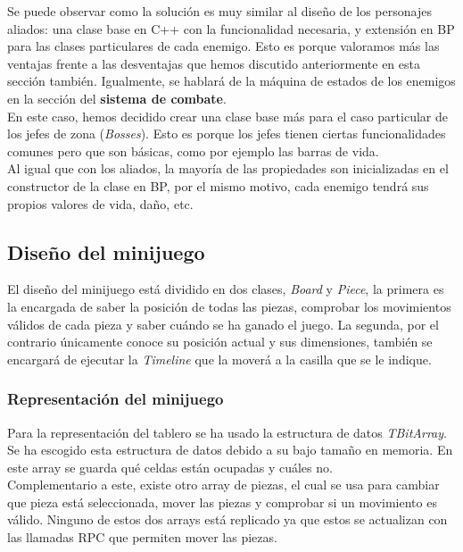 Se puede observar como la solución es muy similar al diseño de los personajes aliados: una clase base en C++ con la funcionalidad necesaria, y extensión en \ac{BP} para las clases particulares de cada enemigo. Esto es porque valoramos más las ventajas frente a las desventajas que hemos discutido anteriormente en esta sección también. Igualmente, se hablará de la máquina de estados de los enemigos en la sección del \textbf{sistema de combate}.
\\

En este caso, hemos decidido crear una clase base más para el caso particular de los jefes de zona (\textit{Bosses}). Esto es porque los jefes tienen ciertas funcionalidades comunes pero que son básicas, como por ejemplo las barras de vida.
\\

Al igual que con los aliados, la mayoría de las propiedades son inicializadas en el constructor de la clase en \ac{BP}, por el mismo motivo, cada enemigo tendrá sus propios valores de vida, daño, etc.

\subsection{Diseño del minijuego}
El diseño del minijuego está dividido en dos clases, \textit{Board} y \textit{Piece}, la primera es la encargada de saber la posición de todas las piezas, comprobar los movimientos válidos de cada pieza y saber cuándo se ha ganado el juego. La segunda, por el contrario únicamente conoce su posición actual y sus dimensiones, también se encargará de ejecutar la \textit{Timeline} que la moverá a la casilla que se le indique. \\

\subsubsection{Representación del minijuego}
Para la representación del tablero se ha usado la estructura de datos \textit{TBitArray}. Se ha escogido esta estructura de datos debido a su bajo tamaño en memoria. En este array se guarda qué celdas están ocupadas y cuáles no. \\

Complementario a este, existe otro array de piezas, el cual se usa para cambiar que pieza está seleccionada, mover las piezas y comprobar si un movimiento es válido. Ninguno de estos dos arrays está replicado ya que estos se actualizan con las llamadas \ac{RPC} que permiten mover las piezas. \\

